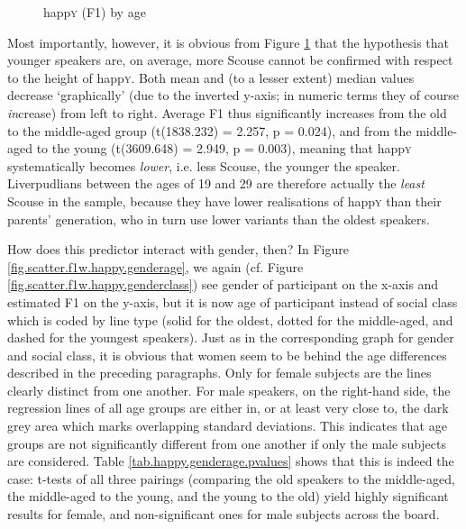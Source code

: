 \begin{figure}[h!]
	\centering
		\resizebox{0.5\linewidth}{!}{} 
		
	\caption{happ\textsc{y} (F1) by age}
	\label{fig.box.f1w.happy.tot}
\end{figure}

Most importantly, however, it is obvious from Figure \ref{fig.box.f1w.happy.tot} that the hypothesis that younger speakers are, on average, more Scouse cannot be confirmed with respect to the height of happ\textsc{y}.
Both mean and (to a lesser extent) median values decrease `graphically' (due to the inverted y-axis; in numeric terms they of course \emph{in}crease) from left to right.
Average F1 thus significantly increases from the old to the middle-aged group (t(1838.232) = 2.257, p = 0.024), and from the middle-aged to the young (t(3609.648) = 2.949, p = 0.003), meaning that happ\textsc{y} systematically becomes \emph{lower}, i.e. less Scouse, the younger the speaker.
Liverpudlians between the ages of 19 and 29 are therefore actually the \emph{least} Scouse in the sample, because they have lower realisations of happ\textsc{y} than their parents' generation, who in turn use lower variants than the oldest speakers.

How does this predictor interact with gender, then?
In Figure \ref{fig.scatter.f1w.happy.genderage}, we again (cf. Figure \ref{fig.scatter.f1w.happy.genderclass}) see gender of participant on the x-axis and estimated F1 on the y-axis, but it is now age of participant instead of social class which is coded by line type (solid for the oldest, dotted for the middle-aged, and dashed for the youngest speakers).
Just as in the corresponding graph for gender and social class, it is obvious that women seem to be behind the age differences described in the preceding paragraphs.
Only for female subjects are the lines clearly distinct from one another.
For male speakers, on the right-hand side, the regression lines of all age groups are either in, or at least very close to, the dark grey area which marks overlapping standard deviations.
This indicates that age groups are not significantly different from one another if only the male subjects are considered.
Table \ref{tab.happy.genderage.pvalues} shows that this is indeed the case: t-tests of all three pairings (comparing the old speakers to the middle-aged, the middle-aged to the young, and the young to the old) yield highly significant results for female, and non-significant ones for male subjects across the board.

